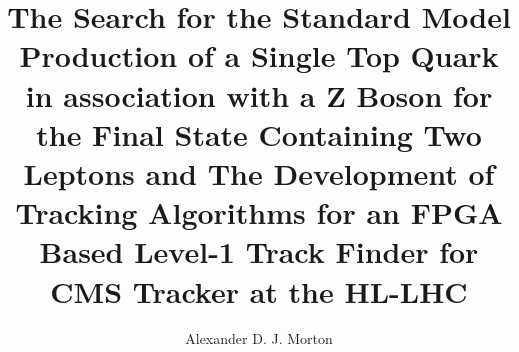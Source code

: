 \documentclass[11pt,a4paper]{report}
\begin{document}
\title{The Search for the Standard Model Production of a Single Top Quark in association with a Z Boson for the Final State Containing Two Leptons 
and
The Development of Tracking Algorithms for an FPGA Based Level-1 Track Finder for CMS Tracker at the HL-LHC}

\author{Alexander D. J. Morton}

\maketitle

\abstract{
%
}



\tableofcontents
\listoftables
\listoffigures



















\begin{appendices}

\end{appendices}



 
\end{document}
